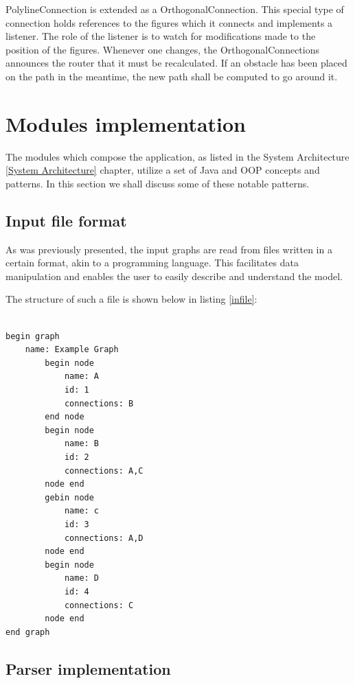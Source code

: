 PolylineConnection is extended as a OrthogonalConnection. This special type of connection holds references to the 
figures which it connects and implements a listener. The role of the listener is to watch for modifications made 
to the position of the figures. Whenever one changes, the OrthogonalConnections announces the router that it 
must be recalculated. If an obstacle has been placed on the path in the meantime, the new path shall be computed 
to go around it.

\section{Modules implementation}

The modules which compose the application, as listed in the System Architecture \ref{System Architecture} chapter, utilize a set of Java 
and OOP concepts and patterns. In this section we shall discuss some of these notable patterns.

\subsection{Input file format}

As was previously presented, the input graphs are read from files written in a certain format, akin to a programming 
language. This facilitates data manipulation and enables the user to easily describe and understand the model. 

The structure of such a file is shown below in listing \ref{infile}:

\begin{lstlisting}[caption=Input file example \label{infile}]

begin graph
    name: Example Graph
        begin node
            name: A
            id: 1
            connections: B
        end node
        begin node
            name: B
            id: 2
            connections: A,C
        node end
        gebin node
            name: c
            id: 3
            connections: A,D
        node end
       	begin node
            name: D
            id: 4
            connections: C
        node end
end graph

\end{lstlisting}

\subsection{Parser implementation}

